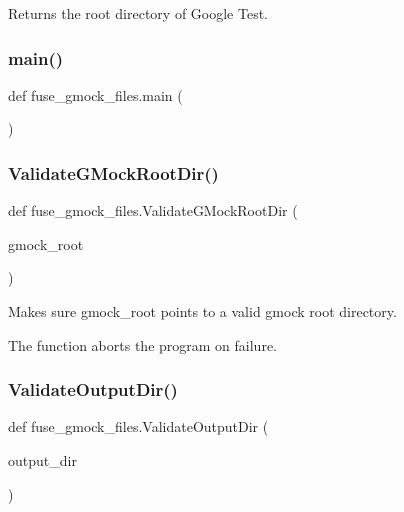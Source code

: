 \begin{DoxyVerb}Returns the root directory of Google Test.\end{DoxyVerb}
 \mbox{\label{namespacefuse__gmock__files_a64e8cd1ead5a1454265cbc2d3db4d425}} 
\subsubsection{\texorpdfstring{main()}{main()}}
{\footnotesize\ttfamily def fuse\+\_\+gmock\+\_\+files.\+main (\begin{DoxyParamCaption}{ }\end{DoxyParamCaption})}

\mbox{\label{namespacefuse__gmock__files_aaec09f55a62b3d65b5d25fe0050e9e05}} 
\subsubsection{\texorpdfstring{ValidateGMockRootDir()}{ValidateGMockRootDir()}}
{\footnotesize\ttfamily def fuse\+\_\+gmock\+\_\+files.\+Validate\+G\+Mock\+Root\+Dir (\begin{DoxyParamCaption}\item[{}]{gmock\+\_\+root }\end{DoxyParamCaption})}

\begin{DoxyVerb}Makes sure gmock_root points to a valid gmock root directory.

The function aborts the program on failure.
\end{DoxyVerb}
 \mbox{\label{namespacefuse__gmock__files_a68581e210793099d656537faa719df29}} 
\subsubsection{\texorpdfstring{ValidateOutputDir()}{ValidateOutputDir()}}
{\footnotesize\ttfamily def fuse\+\_\+gmock\+\_\+files.\+Validate\+Output\+Dir (\begin{DoxyParamCaption}\item[{}]{output\+\_\+dir }\end{DoxyParamCaption})}

